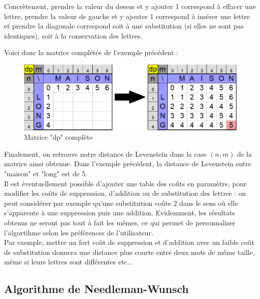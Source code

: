 \documentclass[12pt]{article}
\begin{document}
Concrètement, prendre la valeur du dessus et y ajouter 1 correspond à effacer une lettre, prendre la valeur de gauche et y ajouter 1 correspond à insérer une lettre et prendre la diagonale correspond soit à une substitution (si elles ne sont pas identiques), soit à la conservation des lettres.\\

\newpage

Voici donc la matrice complétée de l'exemple précédent :

\begin{figure}[!h]
    \centering
    \includegraphics[scale = 0.69]{Images/Levenstein/levenstein rempli.png}
    \caption{Matrice "dp" complète}
    \label{fig:Matrice "dp" complète}
\end{figure}

Finalement, on retrouve notre distance de Levenstein dans la case $(n,m)$ de la matrice ainsi obtenue. Dans l'exemple précédent, la distance de Levenstein entre "maison" et "long" est de 5.\\

Il est éventuellement possible d'ajouter une table des coûts en paramètre, pour modifier les coûts de suppression, d'addition ou de substitution des lettres : on peut considérer par exemple qu'une substitution coûte 2 dans le sens où elle s'apparente à une suppression puis une addition. Evidemment, les résultats obtenus ne seront pas tout à fait les mêmes, ce qui permet de personnaliser l'algortihme selon les préférences de l'utilisateur.\\
Par exemple, mettre un fort coût de suppression et d'addition avec un faible coût de substitution donnera une distance plus courte entre deux mots de même taille, même si leurs lettres sont différentes etc...



\subsection{Algorithme de Needleman-Wunsch}
\label{subsec:algo_nw} 
\end{document}
